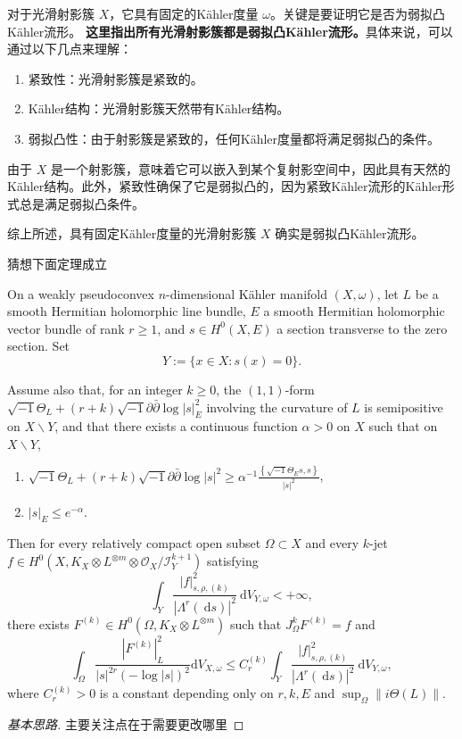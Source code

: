 \documentclass[lang=cn,12pt,a4paper,fontset=none]{beautybook}
\begin{document}
对于光滑射影簇 \( X \)，它具有固定的Kähler度量 \(\omega\)。关键是要证明它是否为弱拟凸Kähler流形。
\textbf{这里指出所有光滑射影簇都是弱拟凸Kähler流形。}具体来说，可以通过以下几点来理解：
\begin{enumerate}
  \item 紧致性：光滑射影簇是紧致的。
  \item Kähler结构：光滑射影簇天然带有Kähler结构。
  \item 弱拟凸性：由于射影簇是紧致的，任何Kähler度量都将满足弱拟凸的条件。
\end{enumerate}


由于 \( X \) 是一个射影簇，意味着它可以嵌入到某个复射影空间中，因此具有天然的Kähler结构。此外，紧致性确保了它是弱拟凸的，因为紧致Kähler流形的Kähler形式总是满足弱拟凸条件。

综上所述，具有固定Kähler度量的光滑射影簇 \( X \) 确实是弱拟凸Kähler流形。

猜想下面定理成立
\begin{theorem}
   On a weakly pseudoconvex $n$-dimensional Kähler manifold $(X, \omega)$, let $L$ be a smooth Hermitian holomorphic line bundle, $E$ a smooth Hermitian holomorphic vector bundle of rank $r \geq 1$, and $s \in H^0(X, E)$ a section transverse to the zero section. Set
$$
Y:=\{x \in X: s(x)=0\} .
$$

Assume also that, for an integer $k \geq 0$, the $(1,1)$-form $\sqrt{-1} \Theta_L+(r+k) \sqrt{-1} \partial \bar{\partial} \log |s|_E^2$ involving the curvature of $L$ is semipositive on $X \backslash Y$, and that there exists a continuous function $\alpha>0$ on $X$ such that on $X \backslash Y$,
\begin{enumerate}[label=(\roman*)]
  \item $\sqrt{-1} \Theta_L+(r+k) \sqrt{-1} \partial \bar{\partial} \log |s|^2 \geq \alpha^{-1} \frac{\left\{\sqrt{-1} \Theta_E s, s\right\}}{|s|^2}$,
  \item $|s|_E \leq e^{-\alpha}$.
\end{enumerate}
Then for every relatively compact open subset $\Omega \subset X$ and every $k$-jet $f \in H^0\left(X, K_X \otimes L^{\otimes m}\otimes \mathscr{O}_X / \mathscr{I}_Y^{k+1}\right)$ satisfying
$$
\int_Y \frac{|f|_{s, \rho,(k)}^2}{\left|\Lambda^r(\mathrm{~d} s)\right|^2} \mathrm{~d} V_{Y, \omega}<+\infty,
$$
there exists $F^{(k)} \in H^0\left(\Omega, K_X \otimes L^{\otimes m}\right)$ such that $J_{\Omega}^k F^{(k)}=f$ and
$$
\int_{\Omega} \frac{\left|F^{(k)}\right|_L^2}{|s|^{2 r} \left(-\log |s|\right)^2} \mathrm{d} V_{X, \omega} \leq C_{r}^{(k)} \int_Y \frac{|f|_{s, \rho,(k)}^2}{\left|\Lambda^r(\mathrm{~d} s)\right|^2} \mathrm{~d} V_{Y, \omega},
$$
where $C_{r}^{(k)}>0$ is a constant depending only on $r, k, E$ and $\sup _{\Omega}\|i \Theta(L)\|$.
\end{theorem}
\begin{proof}[基本思路]
  主要关注点在于需要更改哪里
\end{proof}
\end{document}
